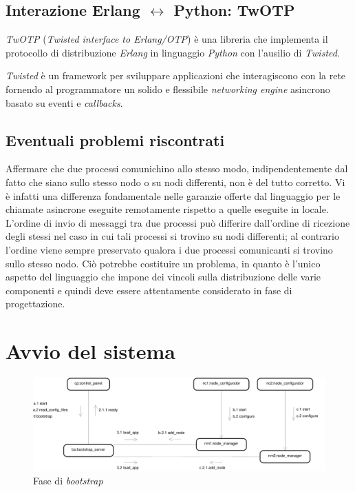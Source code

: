 \documentclass[a4paper]{report}
\newcommand{\Erlang}{\textsl{Erlang}}
\newcommand{\Python}{\textsl{Python}}
\begin{document}
\subsection*{Interazione Erlang $\leftrightarrow$ Python: TwOTP}
\textsl{TwOTP} (\textit{Twisted interface to Erlang/OTP}) è una libreria che implementa il protocollo di distribuzione \Erlang{} in linguaggio \Python{} con l'ausilio di \textsl{Twisted}.

\textsl{Twisted} è un framework per sviluppare applicazioni che interagiscono con la rete fornendo al programmatore un solido e flessibile \textit{networking engine} asincrono basato su eventi e \textit{callbacks}.

\subsection*{Eventuali problemi riscontrati}
Affermare che due processi comunichino allo stesso modo, indipendentemente dal fatto che siano sullo stesso nodo o su nodi differenti, non è del tutto corretto. Vi è infatti una differenza fondamentale nelle garanzie offerte dal linguaggio per le chiamate asincrone eseguite remotamente rispetto a quelle eseguite in locale. L'ordine di invio di messaggi tra due processi può differire dall'ordine di ricezione degli stessi nel caso in cui tali processi si trovino su nodi differenti; al contrario l'ordine viene sempre preservato qualora i due processi comunicanti si trovino sullo stesso nodo. Ciò potrebbe costituire un problema, in quanto è l'unico aspetto del linguaggio che impone dei vincoli sulla distribuzione delle varie componenti e quindi deve essere attentamente considerato in fase di progettazione.

\section{Avvio del sistema}
\label{sec:avvio}

\begin{landscape}
\begin{figure}
\includegraphics[height=.24\paperheight]{diagrammi/Bootstrap}
\caption{Fase di \textit{bootstrap}}
\label{fig:bootstrap}
\end{figure}
\end{landscape}
\end{document}
